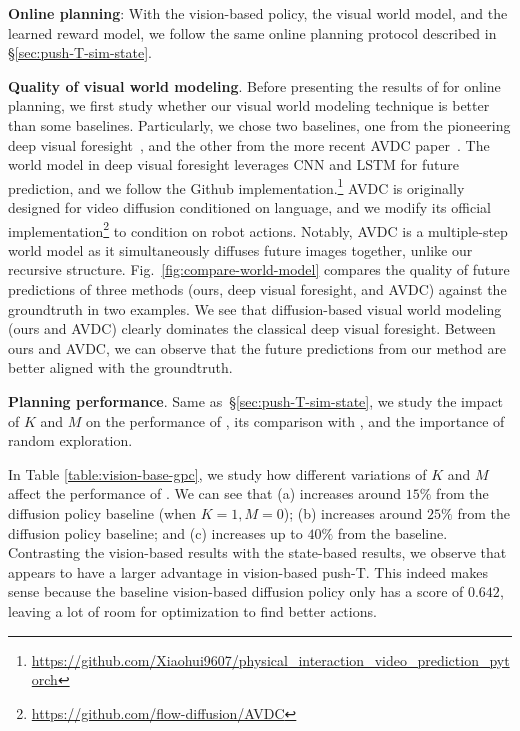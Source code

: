 \textbf{Online planning}: With the vision-based policy, the visual world model, and the learned reward model, we follow the same online planning protocol described in \S\ref{sec:push-T-sim-state}.

\textbf{Quality of visual world modeling}. Before presenting the results of \nameshort for online planning, we first study whether our visual world modeling technique is better than some baselines. Particularly, we chose two baselines, one from the pioneering deep visual foresight~\cite{finn2017deep}, and the other from the more recent AVDC paper~\cite{du2024learning}. The world model in deep visual foresight leverages CNN and LSTM for future prediction, and we follow the Github implementation.\footnote{\url{https://github.com/Xiaohui9607/physical_interaction_video_prediction_pytorch}} AVDC is originally designed for video diffusion conditioned on language, and we modify its official implementation\footnote{\url{https://github.com/flow-diffusion/AVDC}} to condition on robot actions. Notably, AVDC is a multiple-step world model as it simultaneously diffuses future images together, unlike our recursive structure. Fig.~\ref{fig:compare-world-model} compares the quality of future predictions of three methods (ours, deep visual foresight, and AVDC) against the groundtruth in two examples. We see that diffusion-based visual world modeling (ours and AVDC) clearly dominates the classical deep visual foresight. Between ours and AVDC, we can observe that the future predictions from our method are better aligned with the groundtruth.

\textbf{Planning performance}.
Same as~\S\ref{sec:push-T-sim-state}, we study the impact of $K$ and $M$ on the performance of \nameshort, its comparison with \offlinerl, and the importance of random exploration.

In Table \ref{table:vision-base-gpc}, we study how different variations of $K$ and $M$ affect the performance of \nameshort. We can see that (a) \gpcrank increases around $15\%$ from the diffusion policy baseline (when $K=1, M=0$); (b) \gpcopt increases around $25\%$ from the diffusion policy baseline; and (c) \gpcrankopt increases up to $40\%$ from the baseline. Contrasting the vision-based results with the state-based results, we observe that  \gpcopt appears to have a larger advantage in vision-based push-T. This indeed makes sense because the baseline vision-based diffusion policy only has a score of $0.642$, leaving a lot of room for optimization to find better actions. 

